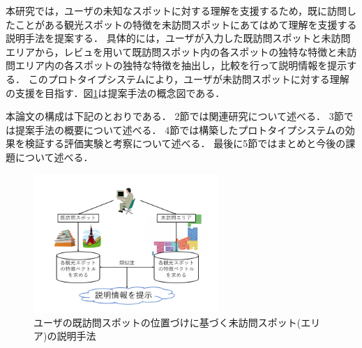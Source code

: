 \documentclass{deimj}
\begin{document}
本研究では，ユーザの未知なスポットに対する理解を支援するため，既に訪問したことがある観光スポットの特徴を未訪問スポットにあてはめて理解を支援する説明手法を提案する．
具体的には，ユーザが入力した既訪問スポットと未訪問エリアから，レビュを用いて既訪問スポット内の各スポットの独特な特徴と未訪問エリア内の各スポットの独特な特徴を抽出し，比較を行って説明情報を提示する．
このプロトタイプシステムにより，ユーザが未訪問スポットに対する理解の支援を目指す．図\ref{fig:photo_image}は提案手法の概念図である．

本論文の構成は下記のとおりである．
2節では関連研究について述べる．
3節では提案手法の概要について述べる．
4節では構築したプロトタイプシステムの効果を検証する評価実験と考察について述べる．
最後に5節ではまとめと今後の課題について述べる．

\begin{figure}[t]
  \begin{center}
    \includegraphics[clip,width=7.0cm]{picture/Photo_Image_jap.png}
    \caption{ユーザの既訪問スポットの位置づけに基づく未訪問スポット(エリア)の説明手法}
    \label{fig:photo_image}
   \end{center}
\end{figure}


\end{document}
